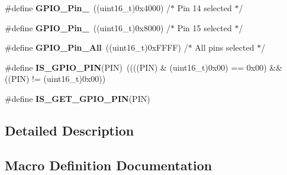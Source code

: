 \begin{DoxyCompactItemize}
\item 
\hypertarget{group___g_p_i_o__pins__define_ga21cd1d89c0c061a6f09c5a842610bee5}{}\#define {\bfseries G\+P\+I\+O\+\_\+\+Pin\+\_}~((uint16\+\_\+t)0x4000)  /$\ast$ Pin 14 selected $\ast$/\label{group___g_p_i_o__pins__define_ga21cd1d89c0c061a6f09c5a842610bee5}

\item 
\hypertarget{group___g_p_i_o__pins__define_gae686a9fc47cf3e420e5db0784210711d}{}\#define {\bfseries G\+P\+I\+O\+\_\+\+Pin\+\_}~((uint16\+\_\+t)0x8000)  /$\ast$ Pin 15 selected $\ast$/\label{group___g_p_i_o__pins__define_gae686a9fc47cf3e420e5db0784210711d}

\item 
\hypertarget{group___g_p_i_o__pins__define_gaba3e915ddca17a1211edc07b7fd97e8b}{}\#define {\bfseries G\+P\+I\+O\+\_\+\+Pin\+\_\+\+All}~((uint16\+\_\+t)0x\+F\+F\+F\+F)  /$\ast$ All pins selected $\ast$/\label{group___g_p_i_o__pins__define_gaba3e915ddca17a1211edc07b7fd97e8b}

\item 
\hypertarget{group___g_p_i_o__pins__define_gad6ec74e33360395535ad5d91ba6d4781}{}\#define {\bfseries I\+S\+\_\+\+G\+P\+I\+O\+\_\+\+P\+I\+N}(P\+I\+N)~((((P\+I\+N) \& (uint16\+\_\+t)0x00) == 0x00) \&\& ((\+P\+I\+N) != (uint16\+\_\+t)0x00))\label{group___g_p_i_o__pins__define_gad6ec74e33360395535ad5d91ba6d4781}

\item 
\#define {\bfseries I\+S\+\_\+\+G\+E\+T\+\_\+\+G\+P\+I\+O\+\_\+\+P\+I\+N}(P\+I\+N)
\end{DoxyCompactItemize}


\subsection{Detailed Description}


\subsection{Macro Definition Documentation}
\hypertarget{group___g_p_i_o__pins__define_gaddf7154b7f30b7c0a70f3aeaff5ddffc}{}
